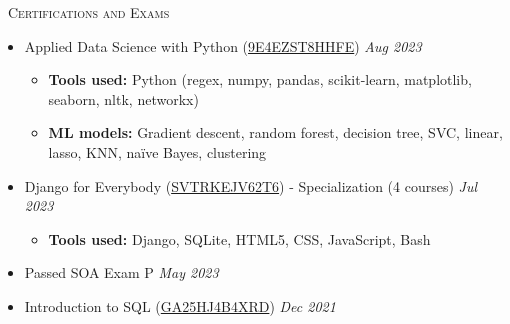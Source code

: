 \documentclass[a4paper,11pt]{article}
\newcommand{\header} [1] {
    \vspace{1mm}
    {\textsc{\large{\xrfill[0.5ex]{0.5pt}~#1~\xrfill[0.5ex]{0.5pt}}}} %
}
\begin{document}
\header{Certifications and Exams} \\
\vspace{1mm}
\begin{itemize}
    \item Applied Data Science with Python (\href{https://www.coursera.org/account/accomplishments/specialization/9E4EZST8HHFE}{9E4EZST8HHFE}) \hfill \emph{Aug 2023}
    \begin{itemize}
        \item \textbf{Tools used:} Python (regex, numpy, pandas, scikit-learn, matplotlib, seaborn, nltk, networkx)
        \item \textbf{ML models:} Gradient descent, random forest, decision tree, SVC, linear, lasso, KNN, na\"{i}ve Bayes, clustering
    \end{itemize}
    \item Django for Everybody (\href{https://www.coursera.org/account/accomplishments/specialization/SVTRKEJV62T6}{SVTRKEJV62T6}) - Specialization (4 courses) \hfill \emph{Jul 2023}
    \begin{itemize}
        \item \textbf{Tools used:} Django, SQLite, HTML5, CSS, JavaScript, Bash
    \end{itemize}
    \item Passed SOA Exam P \hfill \emph{May 2023}
    \item Introduction to SQL (\href{https://www.coursera.org/account/accomplishments/verify/GA25HJ4B4XRD}{GA25HJ4B4XRD}) \hfill  \emph{Dec 2021}
\end{itemize}
\vspace{1mm}


\end{document}
